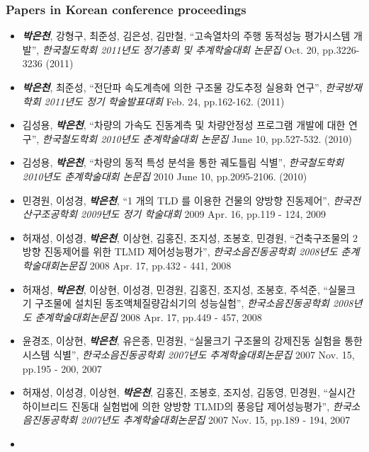 \subsubsection*{Papers in Korean conference proceedings}
\begin{itemize}

\item[]
  \emph{\textbf{박은천}}, 강형구, 최준성, 김은성, 김만철, ``고속열차의 주행
  동적성능 평가시스템 개발'', \emph{한국철도학회 2011년도 정기총회 및
  추계학술대회 논문집} Oct. 20, pp.3226-3236 (2011)
\item[]
  \emph{\textbf{박은천}}, 최준성, ``전단파 속도계측에 의한 구조물 강도추정
  실용화 연구'', \emph{한국방재학회 2011년도 정기 학술발표대회} Feb. 24,
  pp.162-162. (2011)
\item[]
  김성용, \emph{\textbf{박은천}}, ``차량의 가속도 진동계측 및 차량안정성
  프로그램 개발에 대한 연구'', \emph{한국철도학회 2010년도 춘계학술대회
  논문집} June 10, pp.527-532. (2010)
\item[]
  김성용, \emph{\textbf{박은천}}, ``차량의 동적 특성 분석을 통한 궤도틀림
  식별'', \emph{한국철도학회 2010년도 춘계학술대회 논문집} 2010 June 10,
  pp.2095-2106. (2010)
\item[]
  민경원, 이성경, \emph{\textbf{박은천}}, ``1 개의 TLD 를 이용한 건물의 양방향
  진동제어'', \emph{한국전산구조공학회 2009년도 정기 학술대회} 2009 Apr.
  16, pp.119 - 124, 2009
\item[]
  허재성, 이성경, \emph{\textbf{박은천}}, 이상현, 김홍진, 조지성, 조봉호,
  민경원, ``건축구조물의 2방향 진동제어를 위한 TLMD 제어성능평가'',
  \emph{한국소음진동공학회 2008년도 춘계학술대회논문집} 2008 Apr. 17,
  pp.432 - 441, 2008
\item[]
  허재성, \emph{\textbf{박은천}}, 이상현, 이성경, 민경원, 김홍진, 조지성,
  조봉호, 주석준, ``실물크기 구조물에 설치된 동조액체질량감쇠기의
  성능실험'', \emph{한국소음진동공학회 2008년도 춘계학술대회논문집} 2008
  Apr. 17, pp.449 - 457, 2008
\item[]
  윤경조, 이상현, \emph{\textbf{박은천}}, 유은종, 민경원, ``실물크기 구조물의
  강제진동 실험을 통한 시스템 식별'', \emph{한국소음진동공학회 2007년도
  추계학술대회논문집} 2007 Nov. 15, pp.195 - 200, 2007
\item[]
  허재성, 이성경, 이상현, \emph{\textbf{박은천}}, 김홍진, 조봉호, 조지성,
  김동영, 민경원, ``실시간 하이브리드 진동대 실험법에 의한 양방향 TLMD의
  풍응답 제어성능평가'', \emph{한국소음진동공학회 2007년도
  추계학술대회논문집} 2007 Nov. 15, pp.189 - 194, 2007
\item[]

\end{itemize}
